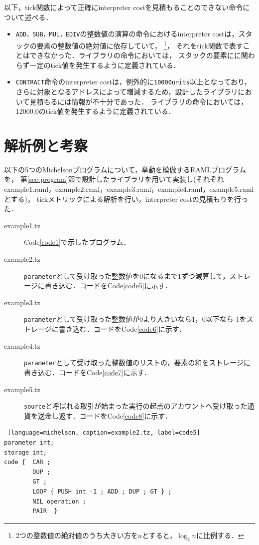 \documentclass{kuisthesis}
\begin{document}
以下，tick関数によって正確にinterpreter costを見積もることのできない命令について述べる．
\begin{itemize}
  \item {\tt ADD，SUB，MUL，EDIV}の整数値の演算の命令におけるinterpreter costは，スタックの要素の整数値の絶対値に依存していて，
  \footnote{2つの整数値の絶対値のうち大きい方を$n$とすると，$\log_2 n$に比例する．}，
  それをtick関数で表すことはできなかった．ライブラリの命令においては，
  スタックの要素にに関わらず一定のtick値を発生するように定義されている．
  \item {\tt CONTRACT}命令のinterpreter costは，例外的に{\tt 10000units}以上となっており，
  さらに対象となるアドレスによって増減するため，設計したライブラリにおいて見積もるには情報が不十分であった．
  ライブラリの命令においては，12000.0のtick値を発生するように定義されている．
\end{itemize}

\section{解析例と考察}
以下の5つのMichelsonプログラムについて，挙動を模倣するRAMLプログラムを，
第\ref{sec-program}節で設計したライブラリを用いて実装し(それぞれexample1.raml，example2.raml，example3.raml，example4.raml，example5.ramlとする)，
tickメトリックによる解析を行い，interpreter costの見積もりを行った．

\begin{description}
  \item [example1.tz] Code\ref{code1}で示したプログラム．
  \item [example2.tz] {\tt parameter}として受け取った整数値を0になるまで1ずつ減算して，ストレージに書き込む．コードをCode\ref{code5}に示す．
  \item [example3.tz] {\tt parameter}として受け取った整数値が0より大きいなら1，0以下なら-1をストレージに書き込む．コードをCode\ref{code6}に示す．
  \item [example4.tz] {\tt parameter}として受け取った整数値のリストの，要素の和をストレージに書き込む．コードをCode\ref{code7}に示す．
  \item [example5.tz] {\tt source}と呼ばれる取引が始まった実行の起点のアカウントへ受け取った通貨を送金し返す．コードをCode\ref{code8}に示す．
\end{description}

\begin{lstlisting} [language=michelson, caption=example2.tz, label=code5]
parameter int;
storage int;
code {  CAR ;
        DUP ;
        GT ;
        LOOP { PUSH int -1 ; ADD ; DUP ; GT } ;
        NIL operation ;
        PAIR  }
\end{lstlisting}
\end{document}
